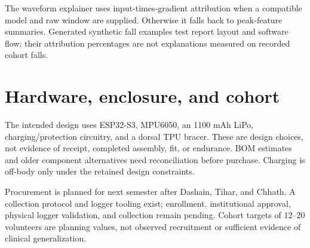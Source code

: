 The waveform explainer uses input-times-gradient attribution when a compatible model and raw window are supplied. Otherwise it falls back to peak-feature summaries. Generated synthetic fall examples test report layout and software flow; their attribution percentages are not explanations measured on recorded cohort falls.


\section{Hardware, enclosure, and cohort}
The intended design uses ESP32-S3, MPU6050, an 1100 mAh LiPo, charging/protection circuitry, and a dorsal TPU bracer. These are design choices, not evidence of receipt, completed assembly, fit, or endurance. BOM estimates and older component alternatives need reconciliation before purchase. Charging is off-body only under the retained design constraints.

Procurement is planned for next semester after Dashain, Tihar, and Chhath. A collection protocol and logger tooling exist; enrollment, institutional approval, physical logger validation, and collection remain pending. Cohort targets of 12--20 volunteers are planning values, not observed recruitment or sufficient evidence of clinical generalization.
